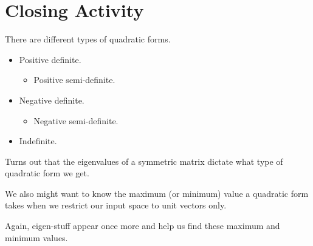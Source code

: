 \documentclass{beamer}
\begin{document}
	\section{Closing Activity}
	\begin{frame}
		There are different types of quadratic forms. \pause
			\begin{itemize}
				\item Positive definite.
					\begin{itemize}
						\item Positive semi-definite.
					\end{itemize}
				\item Negative definite.
					\begin{itemize}
						\item Negative semi-definite.
					\end{itemize}
				\item Indefinite.
			\end{itemize}
		Turns out that the eigenvalues of a symmetric matrix dictate what type of quadratic form we get. \pause

		We also might want to know the maximum (or minimum) value a quadratic form takes when we restrict our input space to unit vectors only.\pause

		Again, eigen-stuff appear once more and help us find these maximum and minimum values.
	\end{frame}
\end{document}
